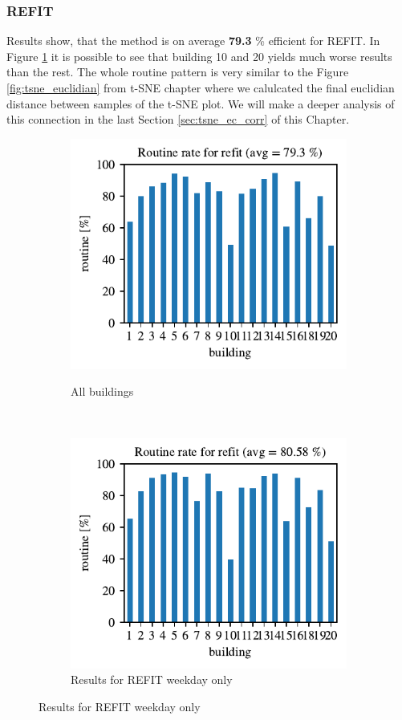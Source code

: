 \subsubsection{REFIT}

Results show, that the method is on average \textbf{79.3} \% efficient for REFIT.  
In Figure \ref{fig:refit_res} it is possible to see that building 10 and 20 yields much worse results than the rest.
The whole routine pattern is very similar to the Figure \ref{fig:tsne_euclidian} from t-SNE chapter where we calulcated the final euclidian distance between samples of the t-SNE plot.
We will make a deeper analysis of this connection in the last Section \ref{sec:tsne_ec_corr} of this Chapter.


\begin{figure}[H]
	\begin{subfigure}{.5\textwidth}
        \caption{All buildings}
        \includegraphics[width=1\textwidth]{Figures/EC/refit_res.pdf}
        \label{fig:refit_res}
    \end{subfigure}
    ~
    \begin{subfigure}{.5\textwidth}
        \caption{Results for REFIT weekday only}
        \includegraphics[width=1\textwidth]{Figures/EC/refit_res_nw_1.pdf}

\end{subfigure}
\end{figure}
